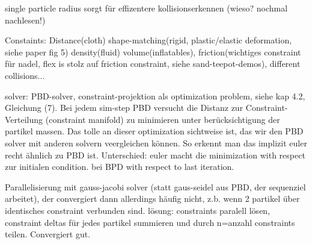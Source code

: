 single particle radius sorgt für effizentere kollisionserkennen (wieso? nochmal nachlesen!)

Constaints: Distance(cloth) shape-matching(rigid, plastic/elastic deformation, siehe paper fig 5) density(fluid) volume(inflatables), friction(wichtiges constraint für nadel, flex is stolz auf friction constraint, siehe sand-teepot-demos), different collisions...

solver: PBD-solver, \cite{UPP} constraint-projektion als optimization problem, siehe kap 4.2, Gleichung (7). Bei jedem sim-step PBD versucht die Distanz zur Constraint-Verteilung (constraint manifold) zu minimieren unter berücksichtigung der partikel massen. Das tolle an dieser optimization sichtweise ist, das wir den PBD solver mit anderen solvern veergleichen können. So erkennt man das implizit euler recht ähnlich zu PBD ist. Unterschied: euler macht die minimization with respect zur initialen condition. bei BPD with respect to last iteration.

Parallelisierung mit gauss-jacobi solver (statt gaus-seidel aus PBD, der sequenziel arbeitet), der convergiert dann allerdings häufig nicht, z.b. wenn 2 partikel über identisches constraint verbunden sind. lösung: constraints paralell lösen, constraint deltas für jedes partikel summieren und durch n=anzahl constraints teilen. Convergiert gut. 





%
%
%

%



